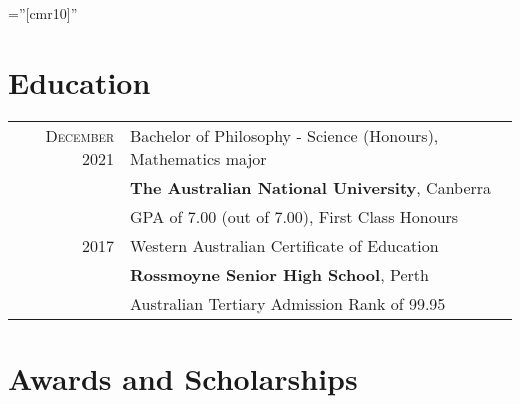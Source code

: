 \documentclass[a4paper,10pt]{article} %
\begin{document}
\pagestyle{empty} %

\font\fb=''[cmr10]'' %


\par{\par} %
\par{\par}


\section{Education}

\begin{tabular}{rl}	
\textsc{December} 2021 &  Bachelor of Philosophy - Science (Honours), Mathematics major\\& \normalsize\textbf{The Australian National University}, Canberra\\
&GPA of 7.00 (out of 7.00), First Class Honours\\


\textsc{} 2017 & Western Australian Certificate of Education\\&\textbf{Rossmoyne Senior High School}, Perth\\
& Australian Tertiary Admission Rank of 99.95\\
\end{tabular}


\section{Awards and Scholarships}
\end{document}
